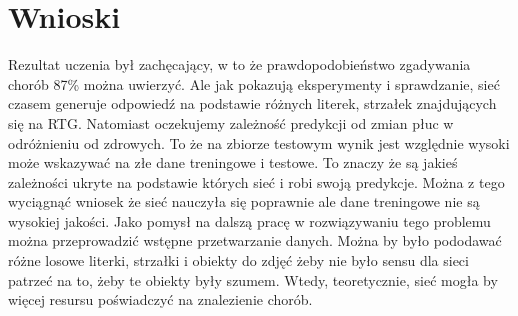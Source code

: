 \documentclass{article}
\begin{document}
\section{Wnioski}
Rezultat uczenia był zachęcający, w to że prawdopodobieństwo zgadywania chorób 87\% można uwierzyć. Ale jak pokazują eksperymenty i sprawdzanie, sieć czasem generuje odpowiedź na podstawie różnych literek, strzałek znajdujących się na RTG. Natomiast oczekujemy zależność predykcji od zmian płuc w odróżnieniu od zdrowych. To że na zbiorze testowym wynik jest względnie wysoki może wskazywać na złe dane treningowe i testowe. To znaczy że są jakieś zależności ukryte na podstawie których sieć i robi swoją predykcje. Można z tego wyciągnąć wniosek że sieć nauczyła się poprawnie ale dane treningowe nie są wysokiej jakości. Jako pomysł na dalszą pracę w rozwiązywaniu tego problemu można przeprowadzić wstępne przetwarzanie danych. Można by było pododawać różne losowe literki, strzałki i obiekty do zdjęć żeby nie było sensu dla sieci patrzeć na to, żeby te obiekty były szumem. Wtedy, teoretycznie, sieć mogła by więcej resursu poświadczyć na znalezienie chorób.

\nocite{backprop_yt}
\nocite{backprop_yt_eng}
\nocite{acta}

	
\end{document}
